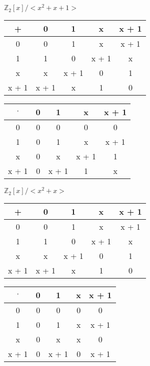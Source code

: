 \documentclass{article}
\begin{document}
$\mathbb{Z}_{2}[x]/<x^{2}+x+1>$
\newline
\newline
\begin{tabular}{c | c c c c}
  + & 0 & 1 & x & x + 1 \\
  \hline
  0 & 0 & 1 & x & x + 1 \\
  1 & 1 & 0 & x + 1 & x \\
  x & x & x + 1 & 0 & 1 \\
  x + 1 & x + 1 & x & 1 & 0 \\
\end{tabular}
\newline
\newline

\begin{tabular}{c | c c c c}
  $\cdot$ & 0 & 1 & x & x + 1 \\
  \hline
  0 & 0 & 0 & 0 & 0 \\
  1 & 0 & 1 & x & x + 1 \\
  x & 0 & x & x + 1 & 1 \\
  x + 1 & 0 & x + 1 & 1 & x \\
\end{tabular}
\newline
\newline

$\mathbb{Z}_{2}[x]/<x^{2}+x>$
\newline
\newline
\begin{tabular}{c | c c c c}
  + & 0 & 1 & x & x + 1 \\
  \hline
  0 & 0 & 1 & x & x + 1 \\
  1 & 1 & 0 & x + 1 & x \\
  x & x & x + 1 & 0 & 1 \\
  x + 1 & x + 1 & x & 1 & 0 \\
\end{tabular}
\newline
\newline

\begin{tabular}{c | c c c c}
  $\cdot$ & 0 & 1 & x & x + 1 \\
  \hline
  0 & 0 & 0 & 0 & 0 \\
  1 & 0 & 1 & x & x + 1 \\
  x & 0 & x & x & 0 \\
  x + 1 & 0 & x + 1 & 0 & x + 1 \\
\end{tabular}
\newline
\newline
\end{document}
